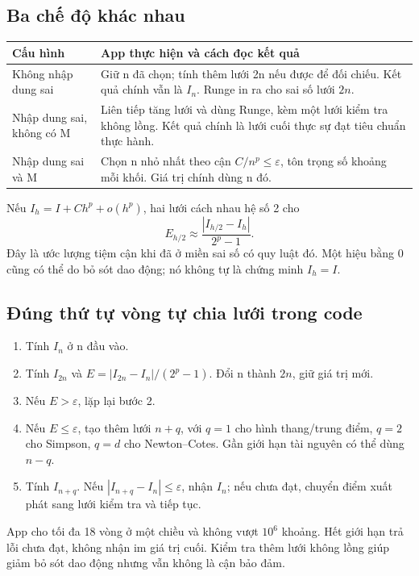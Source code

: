 \subsection{Ba chế độ khác nhau}
\begin{center}\begin{tabular}{p{}p{}}
\toprule Cấu hình&App thực hiện và cách đọc kết quả\\\midrule
Không nhập dung sai&Giữ n đã chọn; tính thêm lưới 2n nếu được để đối chiếu. Kết quả chính vẫn là $I_n$. Runge in ra cho sai số lưới $2n$.\\
Nhập dung sai, không có M&Liên tiếp tăng lưới và dùng Runge, kèm một lưới kiểm tra không lồng. Kết quả chính là lưới cuối thực sự đạt tiêu chuẩn thực hành.\\
Nhập dung sai và M&Chọn n nhỏ nhất theo cận $C/n^p\le\varepsilon$, tôn trọng số khoảng mỗi khối. Giá trị chính dùng n đó.\\\bottomrule
\end{tabular}\end{center}

Nếu $I_h=I+Ch^p+o(h^p)$, hai lưới cách nhau hệ số 2 cho
\[
E_{h/2}\approx\frac{|I_{h/2}-I_h|}{2^p-1}.
\]
Đây là ước lượng tiệm cận khi đã ở miền sai số có quy luật đó. Một hiệu bằng 0 cũng có thể do bỏ sót dao động; nó không tự là chứng minh $I_h=I$.

\subsection{Đúng thứ tự vòng tự chia lưới trong code}
\begin{enumerate}
\item Tính $I_n$ ở n đầu vào.
\item Tính $I_{2n}$ và $E=|I_{2n}-I_n|/(2^p-1)$. Đổi n thành $2n$, giữ giá trị mới.
\item Nếu $E>\varepsilon$, lặp lại bước 2.
\item Nếu $E\le\varepsilon$, tạo thêm lưới $n+q$, với $q=1$ cho hình thang/trung điểm, $q=2$ cho Simpson, $q=d$ cho Newton--Cotes. Gần giới hạn tài nguyên có thể dùng $n-q$.
\item Tính $I_{n+q}$. Nếu $|I_{n+q}-I_n|\le\varepsilon$, nhận $I_n$; nếu chưa đạt, chuyển điểm xuất phát sang lưới kiểm tra và tiếp tục.
\end{enumerate}
App cho tối đa 18 vòng ở một chiều và không vượt $10^6$ khoảng. Hết giới hạn trả lỗi chưa đạt, không nhận im giá trị cuối. Kiểm tra thêm lưới không lồng giúp giảm bỏ sót dao động nhưng vẫn không là cận bảo đảm.

